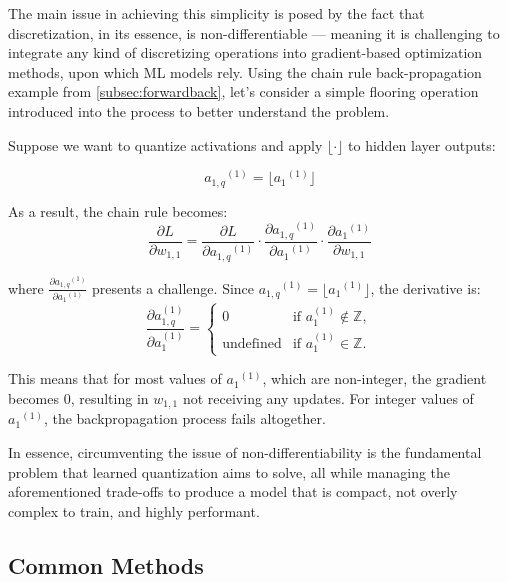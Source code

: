 The main issue in achieving this simplicity is posed by the fact that discretization, in its essence, is non-differentiable
 — meaning it is challenging to integrate any kind of discretizing operations into gradient-based optimization methods, 
 upon which ML models rely. Using the chain rule back-propagation example from \cref{subsec:forwardback}, let's
consider a simple flooring operation introduced into the process to better understand the problem.

Suppose we want to quantize activations and apply \( \lfloor \cdot \rfloor \) to hidden layer outputs:

\[
  {a_{1,q}}^{(1)} =  \lfloor {a_1}^{(1)} \rfloor
  \]

As a result, the chain rule becomes:
 \[
  \frac{\partial L}{\partial w_{1,1}} =  \frac{\partial L}{\partial {a_{1,q}}^{(1)}} 
  \cdot \frac{\partial {a_{1,q}}^{(1)}}{\partial {a_1}^{(1)}} 
  \cdot \frac{\partial {a_1}^{(1)}}{\partial w_{1,1}}
  \]

  where \( \frac{\partial {a_{1,q}}^{(1)}}{\partial {a_1}^{(1)}} \) presents a challenge. 
  Since \(  {a_{1,q}}^{(1)} =  \lfloor {a_1}^{(1)} \rfloor \), the derivative is: 
            \[
            \frac{\partial a_{1,q}^{(1)}}{\partial a_{1}^{(1)}} =
            \begin{cases} 
                0 & \text{if } a_{1}^{(1)} \notin \mathbb{Z}, \\
                \text{undefined} & \text{if } a_{1}^{(1)} \in \mathbb{Z}.
            \end{cases}
            \]

This means that for most values of \( {a_1}^{(1)} \), which are non-integer, the gradient becomes $0$, resulting in 
  $w_{1,1}$ not receiving any updates. For integer values of \( {a_1}^{(1)} \), the backpropagation process fails altogether.

In essence, circumventing the issue of non-differentiability is the fundamental problem that learned quantization aims to solve,
all while managing the aforementioned trade-offs to produce a model that is compact, not overly complex to train,
and highly performant.


\subsection{Common Methods}
\label{subsec:commonlearnedquantizationmethods}

